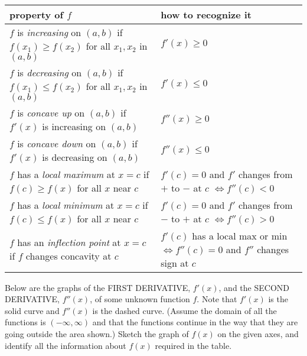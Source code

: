 \documentclass[11pt,fleqn]{article}
\begin{document}
\begin{center}
  \LARGE
  \\
\end{center}

\begin{footnotesize}
\renewcommand\arraystretch{1.5}
\begin{tabular}{|p{.55\linewidth} | p{.4\linewidth}|} \hline
{\bf property of $f$} & {\bf how to recognize it} \\
\hline
\hline
$f$ is \emph{increasing} on $(a,b)$ if $f(x_{1}) \geq f(x_{2})$ for all $x_{1}, x_{2}$ in $(a,b)$ & $f'(x) \geq 0$\\ \hline
$f$ is \emph{decreasing} on $(a,b)$ if $f(x_{1}) \leq f(x_{2})$ for all $x_{1}, x_{2}$ in $(a,b)$ & $f'(x) \leq 0$\\ \hline
$f$ is \emph{concave up} on $(a,b)$ if $f'(x)$ is increasing on $(a,b)$  & $f''(x) \geq 0$\\ \hline
$f$ is \emph{concave down} on $(a,b)$ if $f'(x)$ is decreasing on $(a,b)$ & $f''(x) \leq 0$\\ \hline
$f$ has a \emph{local maximum} at $x = c$ if $f(c) \geq f(x)$ for all $x$ near $c$ & $f'(c) = 0$ and $f'$ changes from $+$ to $-$ at $c$ $\iff f''(c) <0$ \\ \hline
$f$ has a \emph{local minimum} at $x = c$ if $f(c) \leq f(x)$ for all $x$ near $c$ & $f'(c) = 0$ and $f'$ changes from $-$ to $+$ at $c$ $\iff f''(c) > 0$ \\ \hline
$f$ has an \emph{inflection point} at $x = c$ if $f$ changes concavity at $c$ & $f'(c)$ has a local max or min $\iff f''(c) = 0$ and $f''$ changes sign at $c$ \\ \hline
\end{tabular}
\end{footnotesize}


Below are the graphs of the FIRST DERIVATIVE, $f'(x)$, and the SECOND DERIVATIVE, $f''(x)$, of some unknown function $f$. Note that $f'(x)$ is the solid curve and $f''(x)$ is the dashed curve.  (Assume the domain of all the functions is $(-\infty, \infty)$ and that the functions continue in the way that they are going outside the area shown.) Sketch the graph of $f(x)$ on the given axes, and identify all the information about $f(x)$ required in the table.
\end{document}
